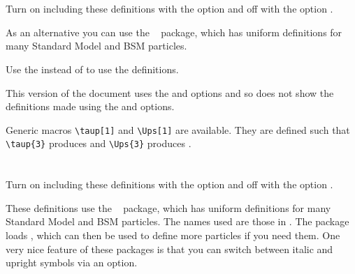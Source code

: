 \documentclass[REPORT=false, mhchem, USenglish]{atlasdoc}
\begin{document}
\maketitle

\tableofcontents




\twocolumn
\section{}

Turn on including these definitions with the option  and off with the option .

As an alternative you can use the ~\cite{hepparticles} package,
which has uniform definitions for many Standard Model and BSM particles.

Use the  instead of  to use the  definitions.

This version of the document uses the  and  options and so
does not show the definitions made using the  and  options.
%

Generic macros \verb|\taup[1]| and \verb|\Ups[1]| are available.
They are defined such that
\verb|\taup{3}| produces  and
\verb|\Ups{3}| produces .


\newpage
\section{}

Turn on including these definitions with the option  and off with the option .

These definitions use the ~\cite{hepparticles} package,
which has uniform definitions for many Standard Model and BSM particles.
The names used are those in .
The package loads , which can then be used to define more particles if you need them.
One very nice feature of these packages is that you can switch between italic and upright symbols via an option.
\end{document}
